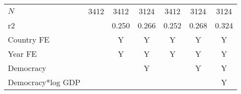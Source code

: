\documentclass[10pt,letterpaper,subeqn]{beamer}
\begin{document}
\begin{frame}
\begin{table}[htbp]
\begin{tabular}{l*{6}{c}}
\hline
\(N\)       &        3412         &        3412         &        3124         &        3412         &        3124         &        3124         \\
r2          &                     &       0.250         &       0.266         &       0.252         &       0.268         &       0.324         \\
\hline
\hline
Country FE        &                     &    Y                 &      Y               &     Y         &           Y          &     Y         \\
Year FE            &                     &    Y                 &      Y               &     Y         &           Y          &     Y         \\
Democracy       &                     &                     &     Y &                     &      Y  &      Y\\
Democracy*log GDP   &                     &                     &                     &                     &                     &      Y\\

\hline
\end{tabular}
\end{table}
\end{frame}
\end{document}

